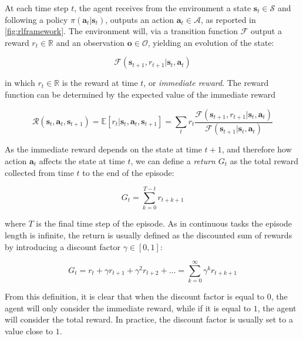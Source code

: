 At each time step $t$, the agent receives from the environment a state $\mathbf{s}_t \in \mathcal{S}$ and following a policy $\pi (\mathbf{a}_t | \mathbf{s}_t)$, outputs an action $\mathbf{a}_t \in \mathcal{A}$, as reported in \cref{fig:rlframework}. The environment will, via a transition function $\mathcal{F}$ output a reward $r_t \in \mathbb{R}$ and an observation $\mathbf{o} \in \mathcal{O}$, yielding an evolution of the state:

\begin{equation}
    \mathcal{F}(\mathbf{s} _{t+1}, r _{t+1} | \mathbf{s} _t, \mathbf{a} _t)
\end{equation}

in which $r_t \in \mathbb{R}$ is the reward at time $t$, or \textit{immediate reward}.
The reward function can be determined by the expected value of the immediate reward

\begin{equation}
    \label{eqn:reward_function}
    \mathcal{R}(\mathbf{s} _t, \mathbf{a} _t, \mathbf{s} _{t+1}) = \mathbb{E} \left[ r _t | \mathbf{s} _t, \mathbf{a} _t, \mathbf{s} _{t+1} \right] = \sum _t r _t \frac{\mathcal{F}(\mathbf{s} _{t+1}, r _{t+1} | \mathbf{s} _t, \mathbf{a} _t)}{\mathcal{F}(\mathbf{s} _{t+1} | \mathbf{s} _t, \mathbf{a} _t)}
\end{equation}

As the immediate reward depends on the state at time $t+1$, and therefore how action $\mathbf{a} _t$ affects the state at time $t$, we can define a \textit{return} $G _t$ as the total reward collected from time $t$ to the end of the episode:

\begin{equation}
    G _t = \sum ^{T - t} _{k = 0} r _{t+k+1}
\end{equation}

where $T$ is the final time step of the episode. As in continuous tasks the episode length is infinite, the return is usually defined as the discounted sum of rewards by introducing a discount factor $\gamma \in [0,1]$:

\begin{equation}
    \label{eqn:recursive_return}
    G _t = r_t + \gamma r _{t+1} + \gamma ^2 r _{t+2} + \dots = \sum ^{\infty} _{k = 0} \gamma ^k r _{t+k+1}
\end{equation}

From this definition, it is clear that when the discount factor is equal to $0$, the agent will only consider the immediate reward, while if it is equal to $1$, the agent will consider the total reward. In practice, the discount factor is usually set to a value close to $1$.

